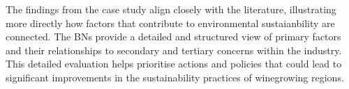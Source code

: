 The findings from the case study align closely with the literature, illustrating more directly how factors that contribute to environmental sustaianbility are connected. The BNs provide a detailed and structured view of primary factors and their relationships to secondary and tertiary concerns within the industry. This detailed evaluation helps prioritise actions and policies that could lead to significant improvements in the sustainability practices of winegrowing regions.













